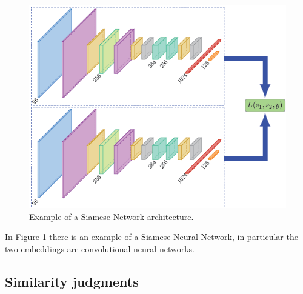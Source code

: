 \documentclass[conference]{IEEEtran}
\begin{document}
					\begin{figure}[!ht]
						\centerline{\includegraphics[width=\linewidth]{imgs/siamese_architecture.png}}
						\caption{Example of a Siamese Network architecture.}
						\label{fig:6}
					\end{figure}
					
					\noindent In Figure \ref{fig:6} there is an example of a Siamese Neural Network, in particular the two embeddings are convolutional neural networks. 
					
			
			\subsection{Similarity judgments}
				
\end{document}
